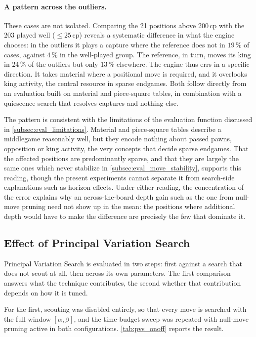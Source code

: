 \paragraph{A pattern across the outliers.}
These cases are not isolated. Comparing the 21 positions above $200$\,cp with the
203 played well ($\leq 25$\,cp) reveals a systematic difference in what the engine
chooses: in the outliers it plays a capture where the reference does not in
$19\,\%$ of cases, against $4\,\%$ in the well-played group. The reference, in
turn, moves its king in $24\,\%$ of the outliers but only $13\,\%$ elsewhere. The
engine thus errs in a specific direction. It takes material where a positional
move is required, and it overlooks king activity, the central resource in sparse
endgames. Both follow directly from an evaluation built on material and
piece-square tables, in combination with a quiescence search that resolves
captures and nothing else.

The pattern is consistent with the limitations of the evaluation function
discussed in \cref{subsec:eval_limitations}. Material and piece-square tables
describe a middlegame reasonably well, but they encode nothing about passed pawns,
opposition or king activity, the very concepts that decide sparse endgames. That
the affected positions are predominantly sparse, and that they are largely the
same ones which never stabilize in \cref{subsec:eval_move_stability}, supports
this reading, though the present experiments cannot separate it from search-side
explanations such as horizon effects. Under either reading, the concentration of
the error explains why an across-the-board depth gain such as the one from
null-move pruning need not show up in the mean: the positions where additional
depth would have to make the difference are precisely the few that dominate it.

\subsection{Effect of Principal Variation Search}
\label{subsec:eval_pvs}

Principal Variation Search is evaluated in two steps: first against a search that
does not scout at all, then across its own parameters. The first comparison
answers what the technique contributes, the second whether that contribution
depends on how it is tuned.

For the first, scouting was disabled entirely, so that every move is searched with
the full window $[\alpha, \beta]$, and the time-budget sweep was repeated with
null-move pruning active in both configurations. \cref{tab:pvs_onoff} reports the
result.

